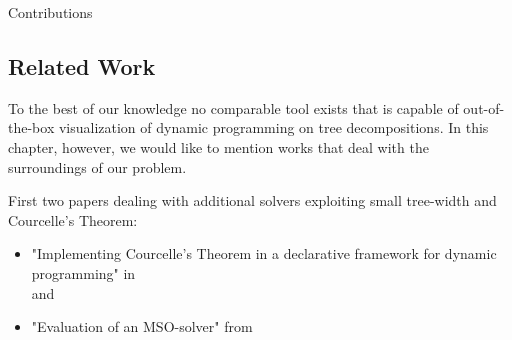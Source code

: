 \documentclass[a4paper, 12pt, bibliography=totoc]{scrartcl}
\begin{document}
Contributions
\subsection{Related Work}

To the best of our knowledge no comparable tool exists that is capable of out-of-the-box visualization of dynamic programming on tree decompositions.
In this chapter, however, we would like to mention works that deal with the surroundings of our problem.

First two papers dealing with additional solvers exploiting small tree-width and Courcelle's Theorem:
\begin{itemize}
	\item "Implementing Courcelle's Theorem in a declarative framework for dynamic programming" in \cite{ImplCourcelleDP16} \\
	and
	\item "Evaluation of an MSO-solver" from \cite{evaluationMSO}
\end{itemize}
%

\end{document}
